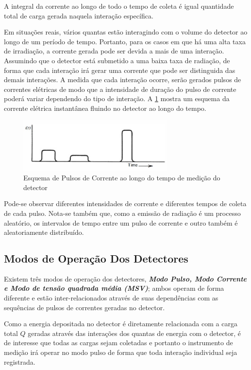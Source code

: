 \documentclass[11pt,a4paper]{article}
\begin{document}
	\noindent A integral da corrente ao longo de todo o tempo de coleta é igual quantidade total de carga gerada naquela interação específica. 

	Em situações reais, vários quantas estão interagindo com o volume do detector ao longo de um período de tempo. Portanto, para os casos em que há uma alta taxa de irradiação, a corrente gerada pode ser devida a mais de uma interação.  Assumindo que o detector está submetido a uma baixa taxa de radiação, de forma que cada interação irá gerar uma corrente que pode ser distinguida das demais interações. A medida que cada interação ocorre, serão gerados pulsos de correntes elétricas de modo que a intensidade de duração do pulso de corrente poderá variar dependendo do tipo de interação. A  \ref{fig:esquemaCorrentePulsada} mostra um esquema da corrente elétrica instantânea fluindo no detector ao longo do tempo.

		\begin{figure}[h]
			\centering
			\includegraphics[width=0.7\textwidth]{Imagens/esquemaCorrentePulsada.jpg}
			\caption{Esquema de Pulsos de Corrente ao longo do tempo de medição do detector}
			\label{fig:esquemaCorrentePulsada}
		\end{figure}

	\noindent Pode-se observar diferentes intensidades de corrente e diferentes tempos de coleta de cada pulso. Nota-se também que, como a emissão de radiação é um processo aleatório, os intervalos de tempo entre um pulso de corrente e outro também é aleatoriamente distribuído. 
      
	\subsection{Modos de Operação Dos Detectores}

		Existem três modos de operação dos detectores, \textcolor{CarnationPink}{\textbf{\textit{Modo Pulso, Modo Corrente e Modo de tensão quadrada média (MSV)}}}; ambos operam de forma diferente e estão inter-relacionados através de suas dependências com as sequências de pulsos de correntes geradas no detector. 

		Como a energia depositada no detector é diretamente relacionada com a carga total $Q$ geradas através das interações dos quantas de energia com o detector, é de interesse que todas as cargas sejam coletadas e portanto o instrumento de medição irá operar no \textcolor{CarnationPink}{modo pulso} de forma que toda interação individual seja registrada. 
\end{document}
